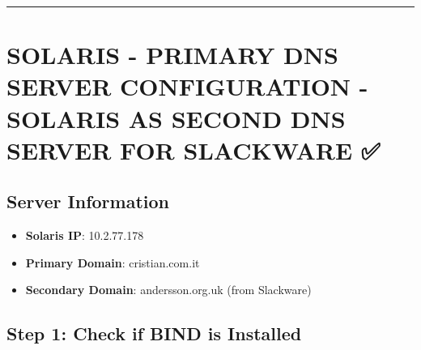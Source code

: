 \begin{Shaded}
\begin{Highlighting}[]
     \KeywordTok{|} 
     \KeywordTok{|} 
\end{Highlighting}
\end{Shaded}

\begin{center}\rule{0.5\linewidth}{0.5pt}\end{center}

\section{SOLARIS - PRIMARY DNS SERVER CONFIGURATION - SOLARIS AS SECOND
DNS SERVER FOR SLACKWARE
✅}\label{solaris---primary-dns-server-configuration---solaris-as-second-dns-server-for-slackware}

\subsection{Server Information}\label{server-information}

\begin{itemize}
\tightlist
\item
  \textbf{Solaris IP}: 10.2.77.178
\item
  \textbf{Primary Domain}: cristian.com.it
\item
  \textbf{Secondary Domain}: andersson.org.uk (from Slackware)
\end{itemize}

\subsection{Step 1: Check if BIND is
Installed}\label{step-1-check-if-bind-is-installed}

\begin{Shaded}
\begin{Highlighting}[]
\end{Highlighting}
\end{Shaded}

